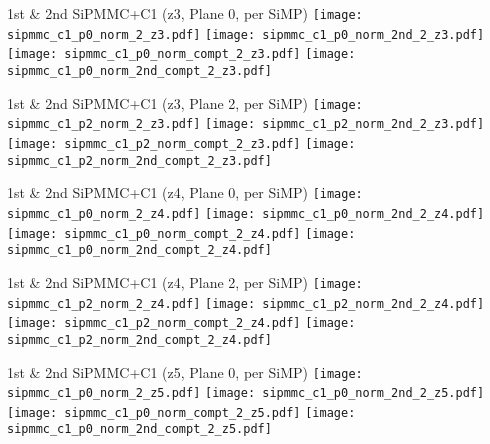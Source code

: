 \documentclass{beamer}
\begin{document}
\begin{frame}{1st \& 2nd SiPMMC+C1 (z3, Plane 0, per SiMP)}
	\texttt{[image: sipmmc\_c1\_p0\_norm\_2\_z3.pdf]}
	\texttt{[image: sipmmc\_c1\_p0\_norm\_2nd\_2\_z3.pdf]} \\
	
		\texttt{[image: sipmmc\_c1\_p0\_norm\_compt\_2\_z3.pdf]}
		\texttt{[image: sipmmc\_c1\_p0\_norm\_2nd\_compt\_2\_z3.pdf]}
\end{frame}

\begin{frame}{1st \& 2nd SiPMMC+C1 (z3, Plane 2, per SiMP)}
	\texttt{[image: sipmmc\_c1\_p2\_norm\_2\_z3.pdf]}
	\texttt{[image: sipmmc\_c1\_p2\_norm\_2nd\_2\_z3.pdf]} \\
	
		\texttt{[image: sipmmc\_c1\_p2\_norm\_compt\_2\_z3.pdf]}
		\texttt{[image: sipmmc\_c1\_p2\_norm\_2nd\_compt\_2\_z3.pdf]}
\end{frame}

\begin{frame}{1st \& 2nd SiPMMC+C1 (z4, Plane 0, per SiMP)}
	\texttt{[image: sipmmc\_c1\_p0\_norm\_2\_z4.pdf]}
	\texttt{[image: sipmmc\_c1\_p0\_norm\_2nd\_2\_z4.pdf]} \\
	
		\texttt{[image: sipmmc\_c1\_p0\_norm\_compt\_2\_z4.pdf]}
		\texttt{[image: sipmmc\_c1\_p0\_norm\_2nd\_compt\_2\_z4.pdf]}
\end{frame}

\begin{frame}{1st \& 2nd SiPMMC+C1 (z4, Plane 2, per SiMP)}
	\texttt{[image: sipmmc\_c1\_p2\_norm\_2\_z4.pdf]}
	\texttt{[image: sipmmc\_c1\_p2\_norm\_2nd\_2\_z4.pdf]} \\
	
		\texttt{[image: sipmmc\_c1\_p2\_norm\_compt\_2\_z4.pdf]}
		\texttt{[image: sipmmc\_c1\_p2\_norm\_2nd\_compt\_2\_z4.pdf]}
\end{frame}

\begin{frame}{1st \& 2nd SiPMMC+C1 (z5, Plane 0, per SiMP)}
	\texttt{[image: sipmmc\_c1\_p0\_norm\_2\_z5.pdf]}
	\texttt{[image: sipmmc\_c1\_p0\_norm\_2nd\_2\_z5.pdf]} \\
	
		\texttt{[image: sipmmc\_c1\_p0\_norm\_compt\_2\_z5.pdf]}
		\texttt{[image: sipmmc\_c1\_p0\_norm\_2nd\_compt\_2\_z5.pdf]}
\end{frame}
\end{document}
